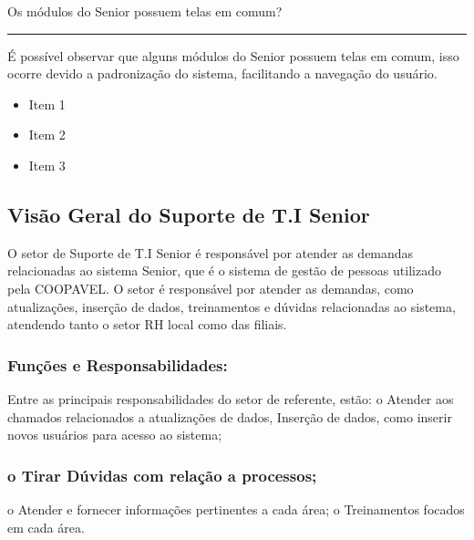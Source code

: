 \documentclass[a4paper,10pt,portuges]{sphinxmanual}
\begin{document}
\sphinxAtStartPar
Os módulos do Senior possuem telas em comum?


\bigskip\hrule\bigskip


\sphinxAtStartPar
É possível observar que alguns módulos do Senior possuem telas em comum, isso ocorre devido a padronização do sistema,
facilitando a navegação do usuário.
\begin{itemize}
\item {} 
\sphinxAtStartPar
Item 1

\item {} 
\sphinxAtStartPar
Item 2

\item {} 
\sphinxAtStartPar
Item 3

\end{itemize}

\noindent{}

\sphinxstepscope


\subsection{Visão Geral do Suporte de T.I Senior}
\label{\detokenize{visao_geral:visao-geral-do-suporte-de-t-i-senior}}\label{\detokenize{visao_geral::doc}}
\sphinxAtStartPar
O setor de Suporte de T.I Senior é responsável por atender as demandas
relacionadas ao sistema Senior, que é o sistema de gestão de pessoas
utilizado pela COOPAVEL. O setor é responsável por atender as demandas, como atualizações, inserção de dados, treinamentos
e dúvidas relacionadas ao sistema, atendendo tanto o setor RH local como das filiais.


\subsubsection{Funções e Responsabilidades:}
\label{\detokenize{visao_geral:funcoes-e-responsabilidades}}
\sphinxAtStartPar
Entre as principais responsabilidades do setor de referente, estão:
o Atender aos chamados relacionados a atualizações de dados,
Inserção de dados, como inserir novos usuários para acesso ao
sistema;


\subsubsection{o Tirar Dúvidas com relação a processos;}
\label{\detokenize{visao_geral:o-tirar-duvidas-com-relacao-a-processos}}
\sphinxAtStartPar
o Atender e fornecer informações pertinentes a cada área;
o Treinamentos focados em cada área.
\end{document}

